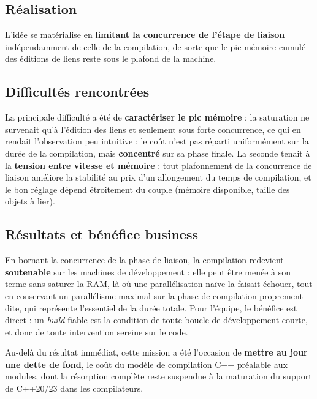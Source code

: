 \subsection{Réalisation}
L'idée se matérialise en \textbf{limitant la concurrence de l'étape de liaison}
indépendamment de celle de la compilation, de sorte que le pic mémoire cumulé
des éditions de liens reste sous le plafond de la machine.

\subsection{Difficultés rencontrées}
La principale difficulté a été de \textbf{caractériser le pic mémoire} : la
saturation ne survenait qu'à l'édition des liens et seulement sous forte
concurrence, ce qui en rendait l'observation peu intuitive : le coût n'est pas
réparti uniformément sur la durée de la compilation, mais \textbf{concentré} sur
sa phase finale. La seconde tenait à la \textbf{tension entre vitesse et
mémoire} : tout plafonnement de la concurrence de liaison améliore la stabilité
au prix d'un allongement du temps de compilation, et le bon réglage dépend
étroitement du couple (mémoire disponible, taille des objets à lier).

\subsection{Résultats et bénéfice business}
En bornant la concurrence de la phase de liaison, la compilation redevient
\textbf{soutenable} sur les machines de développement : elle peut être menée à
son terme sans saturer la RAM, là où une parallélisation naïve la faisait
échouer, tout en conservant un parallélisme maximal sur la phase de
compilation proprement dite, qui représente l'essentiel de la durée totale.
Pour l'équipe, le bénéfice est direct : un \emph{build} fiable est la
condition de toute boucle de développement courte, et donc de toute
intervention sereine sur le code.

Au-delà du résultat immédiat, cette mission a été l'occasion de
\textbf{mettre au jour une dette de fond}, le coût du modèle de compilation C++
préalable aux modules, dont la résorption complète reste suspendue à la
maturation du support de C++20/23 dans les compilateurs.
